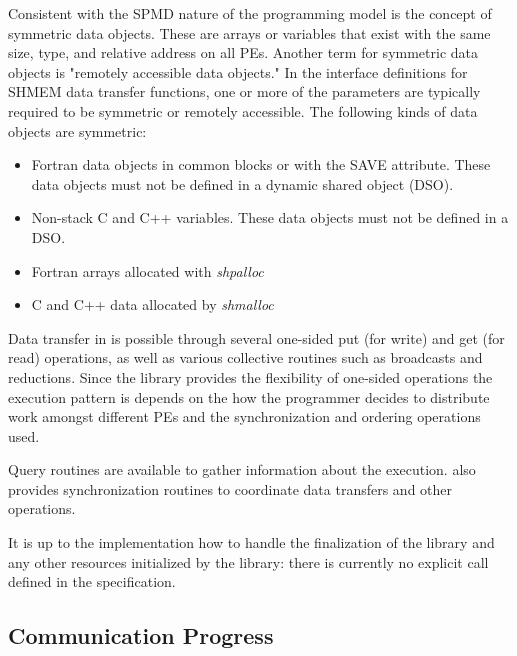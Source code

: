 Consistent with the SPMD nature of the \openshmem programming model  is  the concept of symmetric data objects.  These are arrays or variables that exist with the same size,  type,	 and  relative	address	 on  all  PEs. Another	term  for  symmetric data objects is "remotely accessible data objects."  In the interface definitions for SHMEM data  transfer	 functions,  one or more of the parameters are typically required to be symmetric or remotely accessible. The following kinds of data objects are symmetric:
\begin{itemize}
  \item Fortran data objects in common blocks or with the  SAVE  attribute. These data objects	must not be defined in a dynamic shared object (DSO).
  \item Non-stack C and C++ variables.   These  data	objects must  not  be defined in a DSO.
  \item Fortran arrays allocated with \textit{shpalloc} 
  \item C and C++ data allocated by \textit{shmalloc}
\end{itemize}       

Data transfer in \openshmem is possible through several one-sided put
(for write) and get (for read) operations, as well as various collective
routines such as broadcasts and reductions. Since the library provides the flexibility of one-sided operations the execution pattern is depends on the how the programmer decides to distribute work amongst different PEs and the synchronization and ordering operations used.

Query routines are available to gather information about the execution.
\openshmem also provides synchronization routines to coordinate data
transfers and other operations. 

It is up to the implementation how to handle the finalization of the
\openshmem library and any other resources initialized by the library:
there is currently no explicit call defined in the \openshmem specification.

\subsection{Communication Progress}

